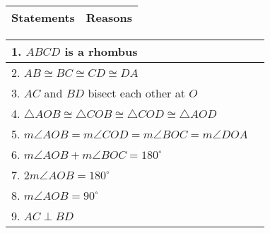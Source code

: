 
\begin{center}
\begin{tabularx}{\textwidth}{|Y|Y|}
\hline
\textbf{Statements} & \textbf{Reasons}  \\
\hline
\end{tabularx} 
\begin{tabularx}{\textwidth}{|X|X|}
\hline
1. \(ABCD\) is a rhombus & \\
\hline
2. \(AB \cong BC \cong CD \cong DA\) & \\
\hline
3. \(AC\) and \(BD\) bisect each other at \(O\) & \\
\hline
4. \(\triangle AOB \cong \triangle COB \cong \triangle COD \cong \triangle AOD\) & \\
\hline
5. \(m\angle AOB = m\angle COD = m\angle BOC = m\angle DOA\) & \\
\hline
6. \(m\angle AOB + m\angle BOC = 180^\circ\) & \\
\hline
7. \(2 m\angle AOB = 180^\circ\) & \\
\hline
8. \(m\angle AOB = 90^\circ\) & \\
\hline
9. \(AC \perp BD\) & \\
\hline
\end{tabularx}
\end{center}


